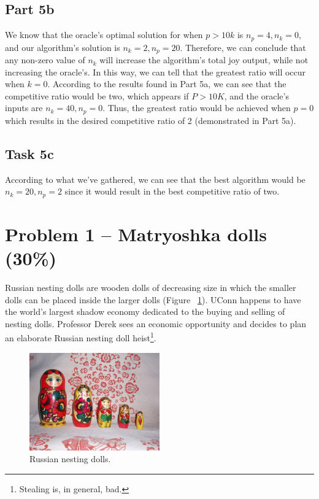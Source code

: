\documentclass[12pt,letterpaper]{article}
\begin{document}
\subsection*{Part 5b}

We know that the oracle's optimal solution for when $p > 10k$ is $n_p = 4, n_k = 0$, and our algorithm's solution is $n_k = 2, n_p = 20$. Therefore, we can conclude that any non-zero value of $n_k$ will increase the algorithm's total joy output, while not increasing the oracle's. In this way, we can tell that the greatest ratio will occur when $k = 0$. According to the results found in Part 5a, we can see that the competitive ratio would be two, which appears if $P > 10K$, and the oracle's inputs are $n_k = 40, n_p = 0$. Thus, the greatest ratio would be achieved when $p = 0$ which results in the desired competitive ratio of 2 (demonstrated in Part 5a).

\subsection*{Task 5c}

According to what we've gathered, we can see that the best algorithm would be $n_k = 20, n_p = 2$ since it would result in the best competitive ratio of two.

\newpage
\section*{Problem 1 -- Matryoshka dolls (30\%)}
Russian nesting dolls are wooden dolls of decreasing size in which the smaller dolls can be placed inside the larger dolls (Figure ~\ref{rnd}).
UConn happens to have the world's largest shadow economy dedicated to the buying and selling of nesting dolls. 
Professor Derek sees an economic opportunity and decides to plan an elaborate Russian nesting doll heist\footnote{Stealing is, in general, bad.}.

\begin{figure}[h!]
    \centering
    \includegraphics[width=0.5\textwidth]{Russian-Matroshka.jpg}
    \caption{Russian nesting dolls.}
    \label{rnd}
\end{figure}
\end{document}
